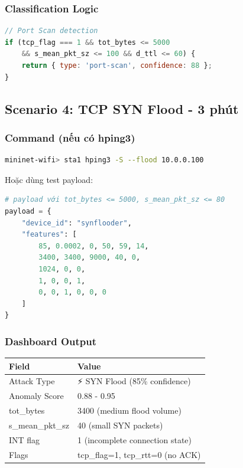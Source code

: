 \documentclass[12pt,a4paper]{article}
\begin{document}
\subsubsection{Classification Logic}
\begin{lstlisting}[language=javascript]
// Port Scan detection
if (tcp_flag === 1 && tot_bytes <= 5000 
    && s_mean_pkt_sz <= 100 && d_ttl <= 60) {
    return { type: 'port-scan', confidence: 88 };
}
\end{lstlisting}

\subsection{Scenario 4: TCP SYN Flood - 3 phút}

\subsubsection{Command (nếu có hping3)}
\begin{lstlisting}[language=bash]
mininet-wifi> sta1 hping3 -S --flood 10.0.0.100
\end{lstlisting}

Hoặc dùng test payload:
\begin{lstlisting}[language=python]
# payload với tot_bytes <= 5000, s_mean_pkt_sz <= 80
payload = {
    "device_id": "synflooder",
    "features": [
        85, 0.0002, 0, 50, 59, 14,
        3400, 3400, 9000, 40, 0,
        1024, 0, 0,
        1, 0, 0, 1,
        0, 0, 1, 0, 0, 0
    ]
}
\end{lstlisting}

\subsubsection{Dashboard Output}
\begin{table}[h]
\centering
\begin{tabularx}{\textwidth}{|l|X|}
\hline
\textbf{Field} & \textbf{Value} \\
\hline
Attack Type & ⚡ \color{red}SYN Flood (85\% confidence) \\
\hline
Anomaly Score & 0.88 - 0.95 \\
\hline
tot\_bytes & 3400 (medium flood volume) \\
\hline
s\_mean\_pkt\_sz & 40 (small SYN packets) \\
\hline
INT flag & 1 (incomplete connection state) \\
\hline
Flags & tcp\_flag=1, tcp\_rtt=0 (no ACK) \\
\hline
\end{tabularx}
\end{table}
\end{document}
